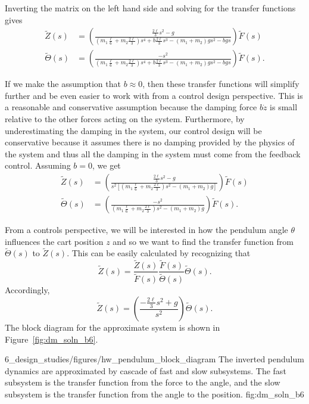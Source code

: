 %
Inverting the matrix on the left hand side and solving for the transfer functions gives
\begin{align*}
\tilde{Z}(s) &= \left(\frac{ \frac{2 \ell}{3} s^2 - g}{(m_1 \frac{\ell}{6}+ m_2 \frac{2 \ell}{3}) s^4 +b\frac{2\ell}{3} s^3 -(m_1+m_2)gs^2-bgs}\right) \tilde{F}(s) \\
\tilde{\Theta}(s) &= \left(\frac{-s^2}{(m_1 \frac{\ell}{6}+ m_2 \frac{2 \ell}{3}) s^4 +b\frac{2\ell}{3} s^3 -(m_1+m_2)gs^2-bgs}\right) \tilde{F}(s).
\end{align*}

If we make the assumption that $b \approx 0$, then these transfer functions will simplify further and be even easier to work with from a control design perspective. This is a reasonable and conservative assumption because the damping force $b\dot{z}$ is small relative to the other forces acting on the system. Furthermore, by underestimating the damping in the system, our control design will be conservative because it assumes there is no damping provided by the physics of the system and thus all the damping in the system must come from the feedback control.
%
Assuming $b=0$, we get
\begin{align*}
\tilde{Z}(s) &= \left(\frac{\frac{2 \ell}{3} s^2 - g}{s^2\left[(m_1 \frac{\ell}{6}+ m_2 \frac{2 \ell}{3}) s^2  -(m_1+m_2)g \right]}\right) \tilde{F}(s) \\
\tilde{\Theta}(s) &= \left(\frac{-s^2}{(m_1 \frac{\ell}{6}+ m_2 \frac{2 \ell}{3}) s^2  -(m_1+m_2)g}\right) \tilde{F}(s).
\end{align*}

From a controls perspective, we will be interested in how the pendulum angle $\theta$ influences the cart position $z$ and so we want to find the transfer function from $\tilde{\Theta}(s)$ to $\tilde{Z}(s)$. This can be easily calculated by recognizing that
\[
\tilde{Z}(s) = \frac{\tilde{Z}(s)}{\tilde{F}(s)}\frac{\tilde{F}(s)}{\tilde{\Theta}(s)} \tilde{\Theta}(s).
\]
Accordingly, 
\[
\tilde{Z}(s) = \left(\frac{-\frac{2 \ell}{3} s^2 + g}{s^2} \right) \tilde{\Theta}(s).
\]
%
The block diagram for the approximate system is shown in Figure~\ref{fig:dm_soln_b6}.

	{6_design_studies/figures/hw_pendulum_block_diagram}
	{The inverted pendulum dynamics are approximated by cascade of fast and slow subsystems.  The fast subsystem is the transfer function from the force to the angle, and the slow subsystem is the transfer function from the angle to the position.}
	{fig:dm_soln_b6}

